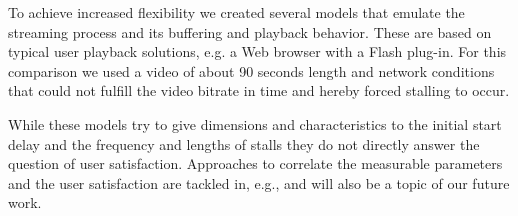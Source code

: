 To achieve increased flexibility we created several models that emulate the streaming process and its buffering and playback behavior. These are based on typical user playback solutions, e.g. a Web browser with a Flash plug-in. For this comparison we used a video of about 90 seconds length and network conditions that could not fulfill the video bitrate in time and hereby forced stalling to occur.

While these models try to give dimensions and characteristics to the initial start delay and the frequency and lengths of stalls they do not directly answer the question of user satisfaction. Approaches to correlate the  measurable parameters and the user satisfaction are tackled in, e.g., \cite{ketyko2010qoe, mokmeasuring, gustafsson2008measuring} and will also be a topic of our future work.


